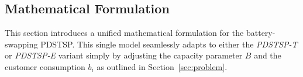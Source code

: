 \documentclass[3p, authoryear, 11pt]{elsarticle}
\begin{document}

\subsection{Mathematical Formulation}
\label{sec:math_formulation}

This section introduces a unified mathematical formulation for the battery-swapping PDSTSP. This single model seamlessly adapts to either the \textit{PDSTSP-T} or \textit{PDSTSP-E} variant simply by adjusting the capacity parameter $B$ and the customer consumption \(b_i\) as outlined in Section~\ref{sec:problem}.
\end{document}
